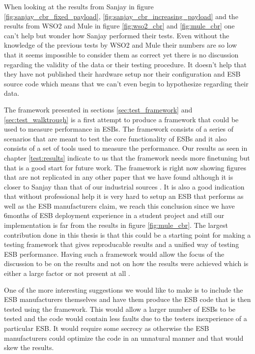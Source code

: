 When looking at the results from Sanjay \cite{Sanjay2011} in figure \ref{fig:sanjay_cbr_fixed_payload}, \ref{fig:sanjay_cbr_increasing_payload} and the results from WSO2 and Mule \cite{Perera07R3,mulesoft08} in figure \ref{fig:wso2_cbr} and \ref{fig:mule_cbr} one can't help but wonder how Sanjay performed their tests.
Even without the knowledge of the previous tests by WSO2 and Mule their numbers are so low that it seems impossible to consider them as correct yet there is no discussion regarding the validity of the data or their testing procedure. 
It doesn't help that they have not published their hardware setup nor their configuration and ESB source code which means that we can't even begin to hypothesize regarding their data. 


The framework presented in sections \ref{sec:test_framework} and \ref{sec:test_walktrough} is a first attempt to produce a framework that could be used to measure performance in ESBs.
The framework consists of a series of scenarios that are meant to test the core functionality of ESBs and it also consists of a set of tools used to measure the performance. 
Our results as seen in chapter \ref{test:results} indicate to us that the framework needs more finetuning but that is a good start for future work. 
The framework is right now showing figures that are not replicated in any other paper that we have found although it is closer to Sanjay \cite{Sanjay2011} than that of our industrial sources \cite{Perera07,Perera07R2,Perera07R3,mulesoft08}.
It is also a good indication that without professional help it is very hard to setup an ESB that performs as well as the ESB manufacturers claim, we reach this conclusion since we have 6months of ESB deployment experience in a student project and still our implementation is far from the results in figure \ref{fig:mule_cbr}. 
The largest contribution done in this thesis is that this could be a starting point for making a testing framework that gives reproducable results and a unified way of testing ESB performance.
Having such a framework would allow the focus of the discussion to be on the results and not on how the results were achieved which is either a large factor \cite{mulesoft08} or not present at all \cite{Sanjay2011}.


One of the more interesting suggestions we would like to make is to include the ESB manufacturers themselves and have them produce the ESB code that is then tested using the framework. 
This would allow a larger number of ESBs to be tested and the code would contain less faults due to the testers inexperience of a particular ESB. 
It would require some secrecy as otherwise the ESB manufacturers could optimize the code in an unnatural manner and that would skew the results.

